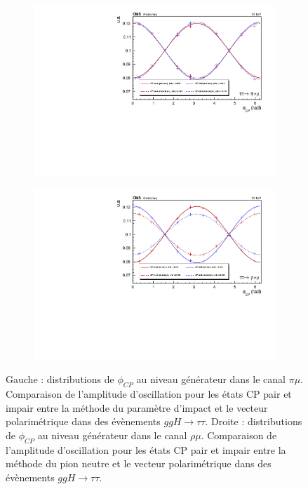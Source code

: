 \begin{figure}
  \begin{subfigure}[b]{0.5\linewidth}
    \centering
    \includegraphics[width=\linewidth]{Chapitre6/Images/PIMU/pimu_pvdpgen.pdf} 
    \caption*{} 
    \vspace{0.5ex}
  \end{subfigure}%
  \begin{subfigure}[b]{0.5\linewidth}
    \centering
    \includegraphics[width=\linewidth]{Chapitre6/Images/RHOMU/rhomu_pvdpgen.pdf} 
    \caption*{} 
    \vspace{0.5ex}
  \end{subfigure} 
\caption{Gauche : distributions de $\phi_{CP}$ au niveau générateur dans le canal $\pi\mu$. Comparaison de l'amplitude d'oscillation pour les états CP pair et impair entre la méthode du paramètre d'impact et le vecteur polarimétrique dans des évènements $ggH\to\tau\tau$. Droite : distributions de $\phi_{CP}$ au niveau générateur dans le canal $\rho\mu$. Comparaison de l'amplitude d'oscillation pour les états CP pair et impair entre la méthode du pion neutre et le vecteur polarimétrique dans des évènements $ggH\to\tau\tau$.}
\label{Xmugen}
\end{figure}


